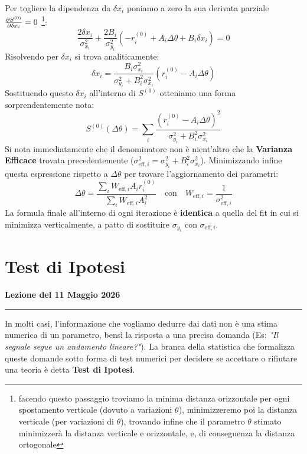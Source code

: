 \documentclass[openany,a4paper,12pt]{book}
\theoremstyle{remark}
\newcommand{\thelezione}{}
\newcommand{\lezione}[2]{
\newpage
\renewcommand{\thelezione}{#2} 
\section{#1} 
\noindent\textbf{\color{RoyalBlue}Lezione del #2}\par\vspace{0.5em}\hrule\vspace{1em}
}
\begin{document}
Per togliere la dipendenza da $\delta x_i$ poniamo a zero la sua derivata parziale $\pderivative{S^{(0)}}{\delta x_i} = 0$ \footnote{facendo questo passaggio troviamo la minima distanza orizzontale per ogni spostamento verticale (dovuto a variazioni $\theta$), minimizzeremo poi la distanza verticale (per variazioni di $\theta$), trovando infine che il parametro $\theta$ stimato 
minimizzerà la distanza verticale e orizzontale, e, di conseguenza
la distanza ortogonale}:
\begin{equation*}
    \frac{2\delta x_i}{\sigma_{x_i}^2} + \frac{2 B_i}{\sigma_{y_i}^2}( -r_i^{(0)} + A_i \Delta\theta + B_i \delta x_i ) = 0
\end{equation*}
Risolvendo per $\delta x_i$ si trova analiticamente:
\begin{equation*}
    \delta x_i = \frac{B_i \sigma_{x_i}^2}{\sigma_{y_i}^2 + B_i^2 \sigma_{x_i}^2} (r_i^{(0)} - A_i \Delta\theta)
\end{equation*}
Sostituendo questo $\delta x_i$ all'interno di $S^{(0)}$ otteniamo una forma sorprendentemente nota:
\begin{equation}
    S^{(0)}(\Delta\theta) = \sum_{i} \frac{(r_i^{(0)} - A_i \Delta\theta)^2}{\sigma_{y_i}^2 + B_i^2 \sigma_{x_i}^2}
\end{equation}
Si nota immediatamente che il denominatore non è nient'altro che la \textbf{Varianza Efficace} trovata precedentemente ($\sigma_{\text{eff}, i}^2 = \sigma_{y_i}^2 + B_i^2 \sigma_{x_i}^2$). Minimizzando infine questa espressione rispetto a $\Delta\theta$ per trovare l'aggiornamento dei parametri:
\begin{equation}
    \Delta\theta = \frac{\sum_i W_{\text{eff}, i} A_i r_i^{(0)}}{\sum_i W_{\text{eff}, i} A_i^2} \quad \text{con} \quad W_{\text{eff}, i} = \frac{1}{\sigma_{\text{eff}, i}^2}
\end{equation}
La formula finale all'interno di ogni iterazione è \textbf{identica} a quella del fit in cui si minimizza verticalmente, a patto di sostituire $\sigma_{y_i}$ con $\sigma_{\text{eff}, i}$.



\lezione{Test di Ipotesi}{11 Maggio 2026}

In molti casi, l'informazione che vogliamo dedurre dai dati non è una stima numerica di un parametro, bensì la risposta a una precisa domanda (Es: \textit{"Il segnale segue un andamento lineare?"}). La branca della statistica che formalizza queste domande sotto forma di test numerici per decidere se accettare o rifiutare una teoria è detta \textbf{Test di Ipotesi}.
\end{document}
